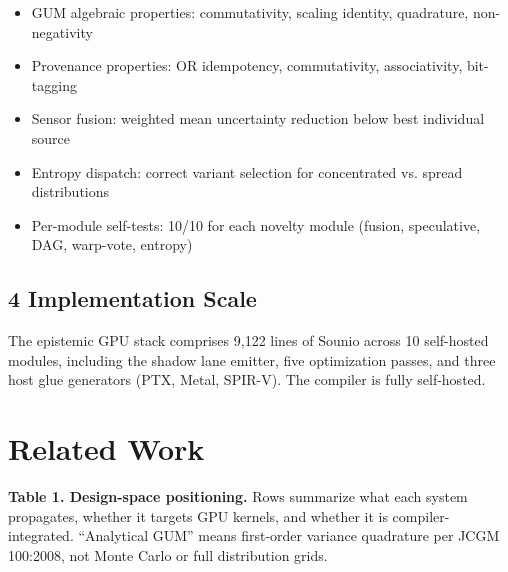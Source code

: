 \documentclass[11pt]{article}
\begin{document}
{{\begin{itemize}
\item GUM algebraic properties: commutativity, scaling identity, quadrature, non-negativity
\item Provenance properties: OR idempotency, commutativity, associativity, bit-tagging
\item Sensor fusion: weighted mean uncertainty reduction below best individual source
\item Entropy dispatch: correct variant selection for concentrated vs. spread distributions
\item Per-module self-tests: 10/10 for each novelty module (fusion, speculative, DAG, warp-vote, entropy)
\end{itemize}

\subsection{4 Implementation Scale}

The epistemic GPU stack comprises 9,122 lines of Sounio across 10 self-hosted modules, including the shadow lane emitter, five optimization passes, and three host glue generators (PTX, Metal, SPIR-V). The compiler is fully self-hosted.


\section{Related Work}

\textbf{Table 1. Design-space positioning.} Rows summarize what each system propagates, whether it targets GPU kernels, and whether it is compiler-integrated. “Analytical GUM” means first-order variance quadrature per JCGM 100:2008, not Monte Carlo or full distribution grids.

}}
\end{document}

